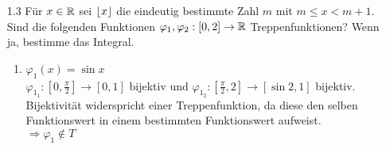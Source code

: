 \documentclass{HM}
\begin{document}
\begin{enumerate}
\begin{enumerate}
		 	
		 \end{enumerate}
		 
		 \item[1.3] Für $x\in\mathbb{R}$ sei $\lfloor x\rfloor$ die eindeutig bestimmte Zahl $m$ mit $m\leq x < m+1$. Sind die folgenden Funktionen $\varphi_1,\varphi_2:[0,2]\to\mathbb{R}$ Treppenfunktionen? Wenn ja, bestimme das Integral.
		 \begin{enumerate}
		 	\item $\varphi_1(x)=\sin x$\\
		 	$\varphi_{1_1}:[0,\frac{\pi}{2}]\to[0,1]$ bijektiv und $\varphi_{1_2}:[\frac{\pi}{2},2]\to[\sin2,1]$ bijektiv.\\
		 	Bijektivität widerspricht einer Treppenfunktion, da diese den selben Funktionswert in einem bestimmten Funktionswert aufweist.\\
		 	$\Rightarrow \varphi_1\not\in T$
		 	

\end{enumerate}
\end{enumerate}
\end{document}
